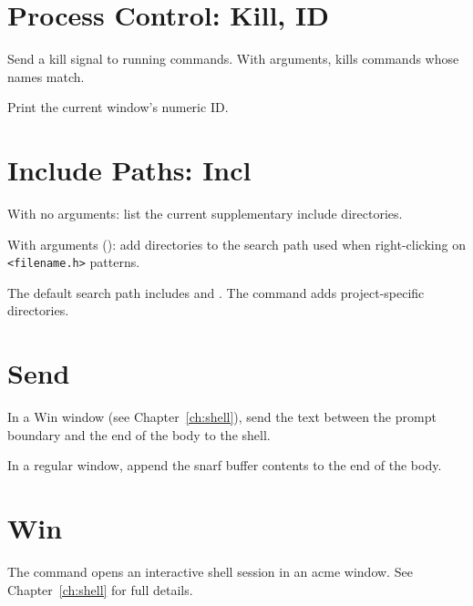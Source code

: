 \section{Process Control: Kill, ID}
\label{sec:process}


\begin{description}[style=nextline]
\item[\cmd{Kill}]
Send a kill signal to running commands.  With arguments, kills
commands whose names match.

\item[\cmd{ID}]
Print the current window's numeric ID.
\end{description}

\section{Include Paths: Incl}
\label{sec:incl}


\begin{description}[style=nextline]
\item[\cmd{Incl}]
With no arguments: list the current supplementary include directories.

With arguments (): add
directories to the search path used when right-clicking on
\texttt{<filename.h>} patterns.
\end{description}

The default search path includes  and
.  The  command adds project-specific
directories.

\section{Send}
\label{sec:send}


\begin{description}[style=nextline]
\item[\cmd{Send}]
In a Win window (see Chapter~\ref{ch:shell}), send the text between
the prompt boundary and the end of the body to the shell.

In a regular window, append the snarf buffer contents to the end
of the body.
\end{description}

\section{Win}
\label{sec:win-brief}


The  command opens an interactive shell session in an acme
window.  See Chapter~\ref{ch:shell} for full details.
